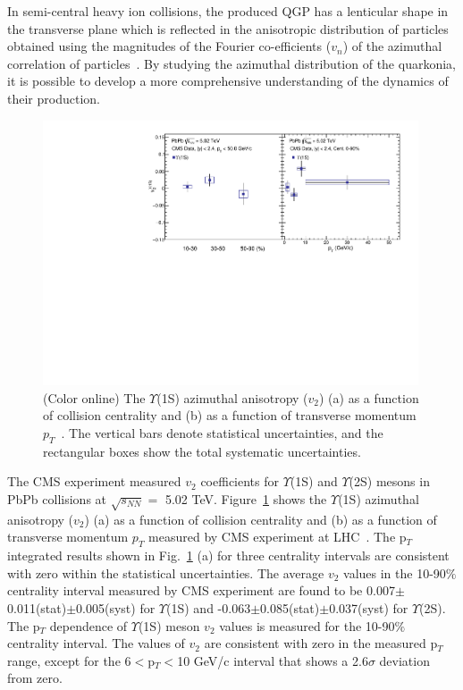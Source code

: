 In semi-central heavy ion collisions,
the produced QGP has a lenticular shape in the transverse plane
which is reflected in the anisotropic
distribution of particles obtained using the magnitudes
of the Fourier co-efficients ($v_{n}$) of the azimuthal correlation of
particles~\cite{Voloshin:1994mz}. By studying the azimuthal distribution of
the quarkonia, it is possible to develop a more comprehensive understanding
of the dynamics of their production.

\begin{figure}
\includegraphics[width=0.99\textwidth]{Figures/ExpOverview/Fig_CMS_Y1S_5TeV_V2.pdf}
\caption{(Color online) The $\Upsilon$(1S) azimuthal anisotropy ($v_{2}$) (a) as a
  function of collision centrality and (b) as a function of transverse momentum
  $p_{T}$~\cite{CMS:2020efs}. The vertical bars denote statistical uncertainties,
  and the rectangular boxes show the total systematic uncertainties.
}
\label{fig:Upsilon1SV2CMS}
\end{figure}



The CMS experiment measured $v_{2}$ coefficients for $\Upsilon$(1S) and $\Upsilon$(2S)
mesons in PbPb collisions at $\sqrt{s_{NN}}=$ 5.02 TeV.
Figure~\ref{fig:Upsilon1SV2CMS} shows the $\Upsilon$(1S) azimuthal
anisotropy ($v_{2}$) (a) as a function of collision centrality and (b) as a
function of transverse momentum $p_{T}$ measured by CMS experiment at
LHC~\cite{CMS:2020efs}. The p$_{T}$ integrated results shown in
Fig.~\ref{fig:Upsilon1SV2CMS} (a) for three centrality intervals are consistent
with zero within the statistical uncertainties. The average $v_{2}$ values in the
10-90$\%$ centrality interval measured by CMS experiment are found to
be 0.007$\pm$0.011(stat)$\pm$0.005(syst) for $\Upsilon$(1S) and
-0.063$\pm$0.085(stat)$\pm$0.037(syst) for $\Upsilon$(2S).   
The p$_{T}$ dependence of $\Upsilon$(1S) meson $v_{2}$ values is measured
for the 10-90$\%$ centrality interval. The values of $v_{2}$ are consistent with
zero in the measured p$_T$ range, except for the 6$<$p$_T$$<$10 GeV/c interval that
shows a 2.6$\sigma$ deviation from zero. 

